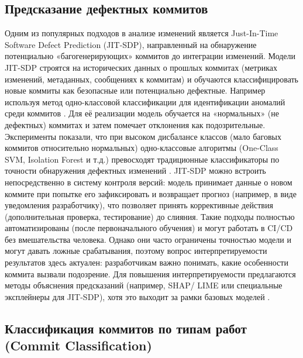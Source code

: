 \subsection{Предсказание дефектных коммитов}
Одним из популярных подходов в анализе изменений является Just-In-Time Software Defect Prediction (JIT-SDP), направленный на обнаружение потенциально «багогенерирующих» коммитов до интеграции изменений. Модели JIT-SDP строятся на исторических данных о прошлых коммитах (метриках изменений, метаданных, сообщениях к коммитам) и обучаются классифицировать новые коммиты как безопасные или потенциально дефектные. Например используя метод одно-классовой классификации для идентификации аномалий среди коммитов \cite{One-Class}. Для её реализации модель обучается на «нормальных» (не дефектных) коммитах и затем помечает отклонения как подозрительные. Эксперименты показали, что при высоком дисбалансе классов (мало баговых коммитов относительно нормальных) одно-классовые алгоритмы (One-Class SVM, Isolation Forest и т.д.) превосходят традиционные классификаторы по точности обнаружения дефектных изменений \cite{One-Class}. JIT-SDP можно встроить непосредственно в систему контроля версий: модель принимает данные о новом коммите при попытке его зафиксировать и возвращает прогноз (например, в виде уведомления разработчику), что позволяет принять коррективные действия (дополнительная проверка, тестирование) до слияния. Такие подходы полностью автоматизированы (после первоначального обучения) и могут работать в CI/CD без вмешательства человека. Однако они часто ограничены точностью модели и могут давать ложные срабатывания, поэтому вопрос интерпретируемости результатов здесь актуален: разработчикам важно понимать, какие особенности коммита вызвали подозрение. Для повышения интерпретируемости предлагаются методы объяснения предсказаний (например, SHAP/ LIME или специальные эксплейнеры для JIT-SDP), хотя это выходит за рамки базовых моделей \cite{One-Class}. 

\subsection{Классификация коммитов по типам работ (Commit Classification)}

